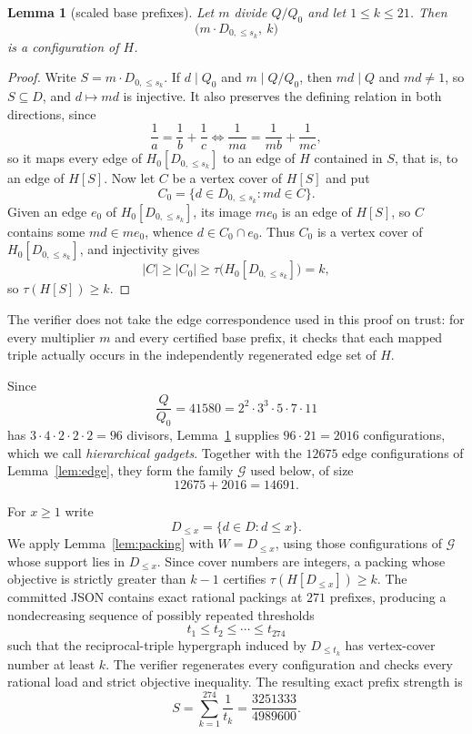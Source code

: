 \documentclass[11pt]{article}
\newtheorem{lemma}[theorem]{Lemma}
\theoremstyle{definition}
\theoremstyle{plain}
\begin{document}
\begin{lemma}[scaled base prefixes]\label{lem:scaling}
Let $m$ divide $Q/Q_0$ and let $1\leq k\leq21$.  Then
\[
 \bigl(m\cdot D_{0,\leq s_k},\ k\bigr)
\]
is a configuration of $H$.
\end{lemma}
\begin{proof}
Write $S=m\cdot D_{0,\leq s_k}$.  If $d\mid Q_0$ and $m\mid Q/Q_0$, then
$md\mid Q$ and $md\neq1$, so $S\subseteq D$, and $d\mapsto md$ is injective.
It also preserves the defining relation in both directions, since
\[
 \frac1a=\frac1b+\frac1c
 \iff
 \frac1{ma}=\frac1{mb}+\frac1{mc},
\]
so it maps every edge of $H_0[D_{0,\leq s_k}]$ to an edge of $H$ contained in
$S$, that is, to an edge of $H[S]$.  Now let $C$ be a vertex cover of $H[S]$
and put
\[
 C_0=\{d\in D_{0,\leq s_k}:md\in C\}.
\]
Given an edge $e_0$ of $H_0[D_{0,\leq s_k}]$, its image $me_0$ is an edge of
$H[S]$, so $C$ contains some $md\in me_0$, whence $d\in C_0\cap e_0$.  Thus
$C_0$ is a vertex cover of $H_0[D_{0,\leq s_k}]$, and injectivity gives
\[
 |C|\geq|C_0|\geq\tau\bigl(H_0[D_{0,\leq s_k}]\bigr)=k,
\]
so $\tau(H[S])\geq k$.
\end{proof}

The verifier does not take the edge correspondence used in this proof on
trust: for every multiplier $m$ and every certified base prefix, it checks
that each mapped triple actually occurs in the independently regenerated edge
set of $H$.

Since
\[
 \frac{Q}{Q_0}=41580=2^2\cdot3^3\cdot5\cdot7\cdot11
\]
has $3\cdot4\cdot2\cdot2\cdot2=96$ divisors, Lemma~\ref{lem:scaling} supplies
$96\cdot21=2016$ configurations, which we call \emph{hierarchical gadgets}.
Together with the $12675$ edge configurations of Lemma~\ref{lem:edge}, they
form the family $\mathcal G$ used below, of size
\[
 12675+2016=14691.
\]

For $x\geq1$ write
\[
 D_{\leq x}=\{d\in D:d\leq x\}.
\]
We apply Lemma~\ref{lem:packing} with $W=D_{\leq x}$, using those
configurations of $\mathcal G$ whose support lies in $D_{\leq x}$.  Since
cover numbers are integers, a packing whose objective is strictly greater
than $k-1$ certifies $\tau(H[D_{\leq x}])\geq k$.
The committed JSON contains exact rational packings at $271$ prefixes,
producing a nondecreasing sequence of possibly repeated thresholds
\[
 t_1\leq t_2\leq\cdots\leq t_{274}
\]
such that the reciprocal-triple hypergraph induced by $D_{\leq t_k}$ has
vertex-cover number at least $k$.  The verifier regenerates every
configuration and checks every rational load and strict objective inequality.
The resulting exact prefix strength is
\[
 S=\sum_{k=1}^{274}\frac1{t_k}
  =\frac{3251333}{4989600}.
\]
\end{document}
